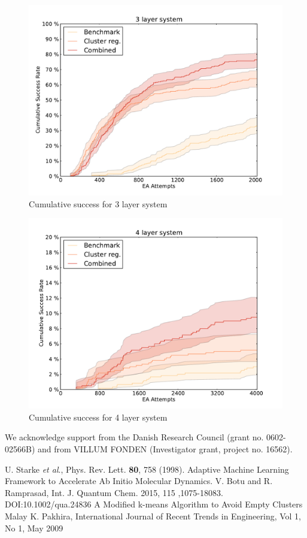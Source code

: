\documentclass[%
 aps,
 prl,%
 amsmath,amssymb,
 reprint,%
]{revtex4-1}
\begin{document}
\begin{figure}[h]
    \centering
    \includegraphics[width=1.0\columnwidth]{3lsuccess.pdf}
    \caption{Cumulative success for 3 layer system}
    \label{fig:fig5}
\end{figure}


\begin{figure}[h]
    \centering
    \includegraphics[width=1.0\columnwidth]{4lsuccess.pdf}
    \caption{Cumulative success for 4 layer system}
    \label{fig:fig6}
\end{figure}



We acknowledge support from the Danish Research Council (grant no. 0602-02566B) and from VILLUM FONDEN (Investigator grant, project no. 16562).

\begin{thebibliography}{12}  
   U. Starke \textit{et al}., Phys. Rev. Lett. \textbf{80}, 758 (1998).    
   {Adaptive Machine Learning Framework to Accelerate Ab Initio Molecular Dynamics.} V. Botu and R. Ramprasad, Int. J. Quantum Chem. 2015, 115 ,1075-18083. DOI:10.1002/qua.24836    
  {A Modified k-means Algorithm to Avoid Empty Clusters} Malay K. Pakhira, International Journal of Recent Trends in Engineering, Vol 1, No 1, May 2009
 \end{thebibliography}
\end{document}
